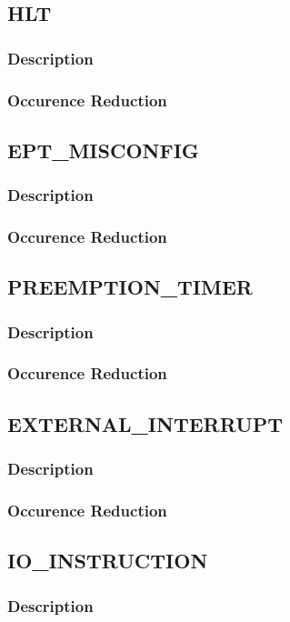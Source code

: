 \documentclass[MMR,Master,english]{twbook}
\begin{document}
\clearpage
\subsection{HLT}
\subsubsection{Description}
\subsubsection{Occurence Reduction}
\clearpage
\subsection{EPT\_MISCONFIG}
\subsubsection{Description}
\subsubsection{Occurence Reduction}
\clearpage
\subsection{PREEMPTION\_TIMER}
\subsubsection{Description}
\subsubsection{Occurence Reduction}
\clearpage
\subsection{EXTERNAL\_INTERRUPT}
\subsubsection{Description}
\subsubsection{Occurence Reduction}
\clearpage
\subsection{IO\_INSTRUCTION}
\subsubsection{Description}
\end{document}

